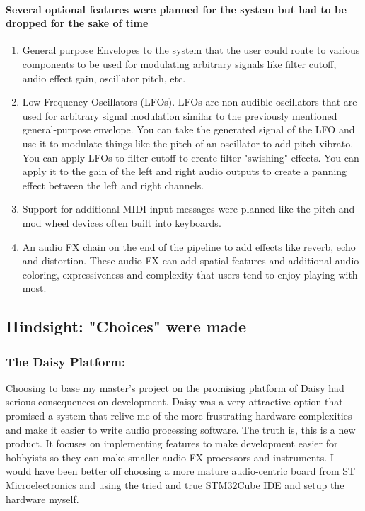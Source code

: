 \documentclass[acmlarge,screen]{acmart}
\begin{document}
	\paragraph{Several optional features were planned for the system but had to be dropped for the sake of time} 
	\begin{enumerate}
		\item General purpose Envelopes to the system that the user could route to various components to be used for modulating arbitrary signals like filter cutoff, audio effect gain, oscillator pitch, etc.
		\item Low-Frequency Oscillators (LFOs). LFOs are non-audible oscillators that are used for arbitrary signal modulation similar to the previously mentioned general-purpose envelope. You can take the generated signal of the LFO and use it to modulate things like the pitch of an oscillator to add pitch vibrato. You can apply LFOs to filter cutoff to create filter "swishing" effects. You can apply it to the gain of the left and right audio outputs to create a panning effect between the left and right channels.\cite{paris_2022}
		\item Support for additional MIDI input messages were planned like the pitch and mod wheel devices often built into keyboards.
		\item An audio FX chain on the end of the pipeline to add effects like reverb, echo and distortion. These audio FX can add spatial features and additional audio coloring, expressiveness and complexity that users tend to enjoy playing with most.
	\end{enumerate}
	
	\subsection{Hindsight: "Choices" were made} 
	\subsubsection{The Daisy Platform:} Choosing to base my master's project on the promising platform of Daisy had serious consequences on development. Daisy was a very attractive option that promised a system that relive me of the more frustrating hardware complexities and make it easier to write audio processing software. The truth is, this is a new product. It focuses on implementing features to make development easier for hobbyists so they can make smaller audio FX processors and instruments. I would have been better off choosing a more mature audio-centric board from ST Microelectronics and using the tried and true STM32Cube IDE and setup the hardware myself.
\end{document}
